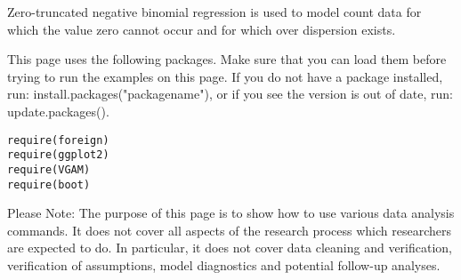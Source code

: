 \documentclass[MASTER.tex]{subfiles}
\begin{document}
	

	\begin{frame}[fragile]
Zero-truncated negative binomial regression is used to model count data for which the value zero cannot occur and for which over dispersion exists.

This page uses the following packages. Make sure that you can load them before trying to run the examples on this page. If you do not have a package installed, run: install.packages("packagename"), or if you see the version is out of date, run: update.packages().

\begin{framed}
\begin{verbatim}
require(foreign)
require(ggplot2)
require(VGAM)
require(boot)
\end{verbatim}
\end{framed}
\end{frame}
\begin{frame}
%

Please Note: The purpose of this page is to show how to use various data analysis commands. It does not cover all aspects of the research process which researchers are expected to do. In particular, it does not cover data cleaning and verification, verification of assumptions, model diagnostics and potential follow-up analyses.
\end{frame}
\end{document}
